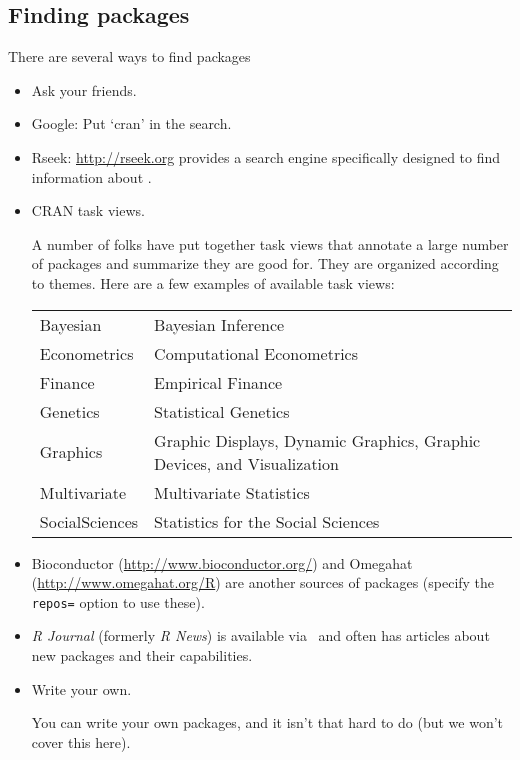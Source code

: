 \subsection{Finding packages}
There are several ways to find packages
\begin{itemize}
  \item Ask your friends.
  \item Google:  Put `cran' in the search.
  \item Rseek:  \url{http://rseek.org} provides a search engine specifically
  designed to find information about \R.
  \item CRAN task views.

  A number of folks have put together task views that annotate a large
  number of packages and summarize they are good for.  They are 
  organized according to themes.  Here are a few examples
  of available task views:

  \UndefineShortVerb{\&}
  \begin{center}
    \begin{tabular}{lp{}}
    Bayesian &    Bayesian Inference \\
    Econometrics &   Computational Econometrics \\
    Finance &   Empirical Finance \\
    Genetics &   Statistical Genetics \\
    Graphics &   Graphic Displays,  Dynamic Graphics,
          Graphic Devices, and Visualization \\
    Multivariate &   Multivariate Statistics \\
    SocialSciences &   Statistics for the Social Sciences \\
    \end{tabular}
  \end{center}
  \DefineShortVerb{\&}

  \item Bioconductor (\url{http://www.bioconductor.org/}) 
  and Omegahat (\url{http://www.omegahat.org/R}) 
are another
  sources of packages (specify the \verb!repos=! option to use these).

  \item 
  \textit{R Journal}  (formerly \textit{R News})
  is available via \cran\ and 
  often has articles about new packages and their capabilities.

  \item Write your own.

  You can write your own packages, and it isn't that hard to do (but 
we won't cover this here).
\end{itemize}

